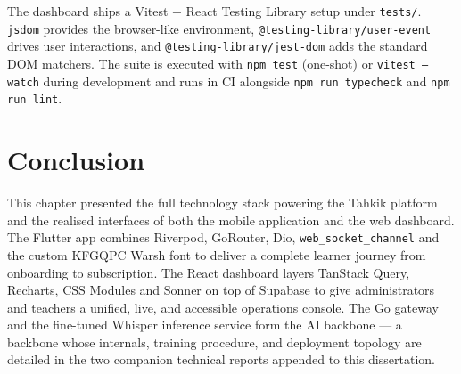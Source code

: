 The dashboard ships a Vitest + React Testing Library setup under \texttt{tests/}. \texttt{jsdom} provides the browser-like environment, \texttt{@testing-library/user-event} drives user interactions, and \texttt{@testing-library/jest-dom} adds the standard DOM matchers. The suite is executed with \texttt{npm test} (one-shot) or \texttt{vitest --watch} during development and runs in CI alongside \texttt{npm run typecheck} and \texttt{npm run lint}.

\section{Conclusion}
This chapter presented the full technology stack powering the Tahkik platform and the realised interfaces of both the mobile application and the web dashboard. The Flutter app combines Riverpod, GoRouter, Dio, \texttt{web\_socket\_channel} and the custom KFGQPC Warsh font to deliver a complete learner journey from onboarding to subscription. The React dashboard layers TanStack Query, Recharts, CSS Modules and Sonner on top of Supabase to give administrators and teachers a unified, live, and accessible operations console. The Go gateway and the fine-tuned Whisper inference service form the AI backbone --- a backbone whose internals, training procedure, and deployment topology are detailed in the two companion technical reports appended to this dissertation.
